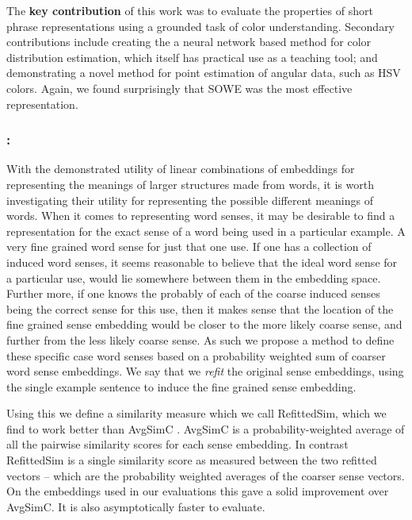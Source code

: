 \documentclass{book}
\begin{document}
The \textbf{key contribution} of this work was to evaluate the properties of short phrase representations using a grounded task of color understanding.
Secondary contributions include
creating the a neural network based method for color distribution estimation, which itself has practical use as a teaching tool;
and demonstrating a novel method for point estimation of angular data, such as HSV colors.
Again, we found surprisingly that SOWE was the most effective representation.




\subsubsection{: }
With the demonstrated utility of linear combinations of embeddings for representing the meanings of larger structures made from words,
it is worth investigating their utility for representing the possible different meanings of words.
When it comes to representing word senses, it may be desirable to find a representation for the exact sense of a word being used in a particular example.
A very fine grained word sense for just that one use.
If one has a collection of induced word senses, it seems reasonable to believe that the ideal word sense for a particular use, would lie somewhere between them in the embedding space.
Further more, if one knows the probably of each of the coarse induced senses being the correct sense for this use,
then it makes sense that the location of the fine grained sense embedding would be closer to the more likely coarse sense,
and further from the less likely coarse sense.
As such we propose a method to define these specific case word senses based on a probability weighted sum of coarser word sense embeddings.
We say that we \emph{refit} the original sense embeddings, using the single example sentence to induce the fine grained sense embedding.

Using this we define a similarity measure which we call RefittedSim, which we find to work better than AvgSimC \citep{Reisinger2010}.
AvgSimC is a probability-weighted average of all the pairwise similarity scores for each sense embedding.
In contrast RefittedSim is a single similarity score as measured between the two refitted vectors -- which are the probability weighted averages of the coarser sense vectors.
On the embeddings used in our evaluations this gave a solid improvement over AvgSimC.
It is also asymptotically faster to evaluate.
\end{document}
